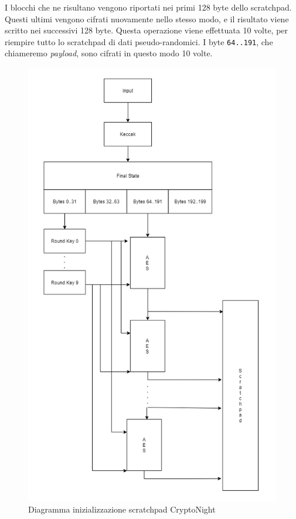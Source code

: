 I blocchi che ne risultano vengono riportati nei primi 128 byte dello
scratchpad. Questi ultimi vengono cifrati nuovamente nello stesso modo,
e il risultato viene scritto nei successivi 128 byte. Questa operazione
viene effettuata 10 volte, per riempire tutto lo scratchpad di dati
pseudo-randomici. I byte \texttt{64..191}, che chiameremo
\emph{payload}, sono cifrati in questo modo 10 volte. 

\begin{figure}[h]
  \centering
  \includegraphics[width = 1\textwidth]{image_pt1.png}
  \caption{Diagramma inizializzazione scratchpad CryptoNight}
  \label{fig:my_label}
\end{figure}

